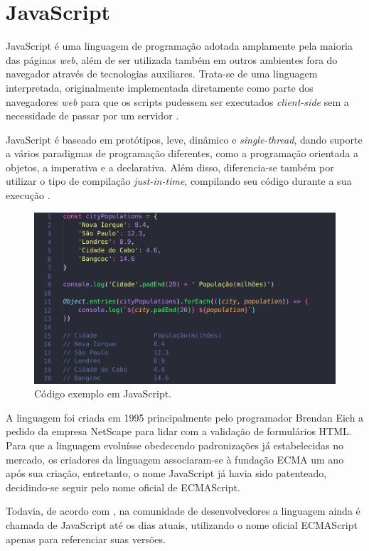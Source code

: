 \section{JavaScript}
\label{sec:javascript}
JavaScript é uma linguagem de programação adotada amplamente pela maioria das páginas \textit{web}, além de ser utilizada também em outros ambientes fora do navegador através de tecnologias auxiliares. Trata-se de uma linguagem interpretada, originalmente implementada diretamente como parte dos navegadores \textit{web} para que os scripts pudessem ser executados \textit{client-side} sem a necessidade de passar por um servidor \cite{Mozilla2023}.

JavaScript é baseado em protótipos, leve, dinâmico e \textit{single-thread}, dando suporte a vários paradigmas de programação diferentes, como a programação orientada a objetos, a imperativa e a declarativa. Além disso, diferencia-se também por utilizar o tipo de compilação \textit{just-in-time}, compilando seu código durante a sua execução \cite{Mozilla2023}.

\begin{figure}[H]
    \centering
    \caption{Código exemplo em JavaScript.}
    \label{fig:javascript}
    \includegraphics[width=.65\textwidth]{data/figures/javascript.png}
\end{figure}

A linguagem foi criada em 1995 principalmente pelo programador Brendan Eich a pedido da empresa NetScape para lidar com a validação de formulários HTML. Para que a linguagem evoluísse obedecendo padronizações já estabelecidas no mercado, os criadores da linguagem associaram-se à fundação ECMA um ano após sua criação, entretanto, o nome JavaScript já havia sido patenteado, decidindo-se seguir pelo nome oficial de ECMAScript.

Todavia, de acordo com , na comunidade de desenvolvedores a linguagem ainda é chamada de JavaScript até os dias atuais, utilizando o nome oficial ECMAScript apenas para referenciar suas versões.